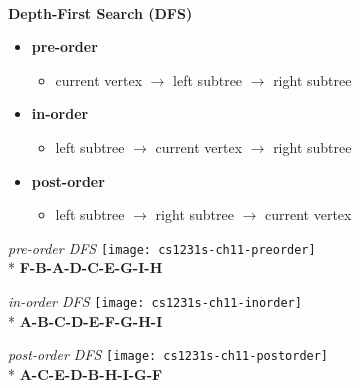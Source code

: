 \documentclass[10pt, landscape]{article}
\let\then\rightarrow
\begin{document}
\begin{multicols}{4}
\ 
\\ \textbf{Depth-First Search (DFS)}
\begin{itemize}
    \item \textbf{pre-order}
    \begin{itemize}
        \item current vertex $\then$ left subtree $\then$ right subtree
    \end{itemize}
    \item \textbf{in-order}
    \begin{itemize}
        \item left subtree $\then$ current vertex $\then$ right subtree
    \end{itemize}
    \item \textbf{post-order}
    \begin{itemize}
        \item left subtree $\then$ right subtree $\then$ current vertex 
    \end{itemize}
\end{itemize}
\begin{center}
    \begin{multicols}{3}
        \textit{pre-order DFS}
        \texttt{[image: cs1231s-ch11-preorder]}
        \\* {\tiny\textbf{F-B-A-D-C-E-G-I-H}}
        
        \textit{in-order DFS}
        \texttt{[image: cs1231s-ch11-inorder]}
        \\* {\tiny\textbf{A-B-C-D-E-F-G-H-I}}
        
        \textit{post-order DFS}
        \texttt{[image: cs1231s-ch11-postorder]}
        \\* {\tiny\textbf{A-C-E-D-B-H-I-G-F}}
    \end{multicols}
\end{center}


\end{multicols}
\end{document}
